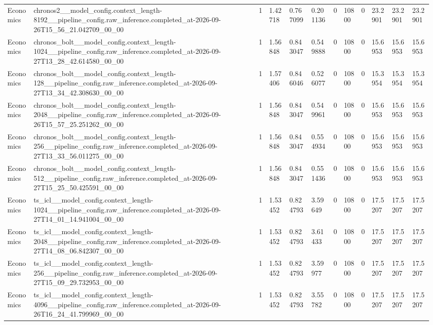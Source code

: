 \begin{tabular}{llllllllllll}
Economics & chronos2\_\_model\_config.context\_length-8192\_\_pipeline\_config.raw\_inference.completed\_at-2026-09-26T15\_56\_21.042709\_00\_00 & 1 & 1.42718 & 0.767099 & 0.201136 & 0 & 10800 & 0 & 23.2901 & 23.2901 & 23.2901 \\
Economics & chronos\_bolt\_\_model\_config.context\_length-1024\_\_pipeline\_config.raw\_inference.completed\_at-2026-09-27T13\_28\_42.614580\_00\_00 & 1 & 1.56848 & 0.843047 & 0.549888 & 0 & 10800 & 0 & 15.6953 & 15.6953 & 15.6953 \\
Economics & chronos\_bolt\_\_model\_config.context\_length-128\_\_pipeline\_config.raw\_inference.completed\_at-2026-09-27T13\_34\_42.308630\_00\_00 & 1 & 1.57406 & 0.846046 & 0.526077 & 0 & 10800 & 0 & 15.3954 & 15.3954 & 15.3954 \\
Economics & chronos\_bolt\_\_model\_config.context\_length-2048\_\_pipeline\_config.raw\_inference.completed\_at-2026-09-26T15\_57\_25.251262\_00\_00 & 1 & 1.56848 & 0.843047 & 0.549961 & 0 & 10800 & 0 & 15.6953 & 15.6953 & 15.6953 \\
Economics & chronos\_bolt\_\_model\_config.context\_length-256\_\_pipeline\_config.raw\_inference.completed\_at-2026-09-27T13\_33\_56.011275\_00\_00 & 1 & 1.56848 & 0.843047 & 0.554934 & 0 & 10800 & 0 & 15.6953 & 15.6953 & 15.6953 \\
Economics & chronos\_bolt\_\_model\_config.context\_length-512\_\_pipeline\_config.raw\_inference.completed\_at-2026-09-27T15\_25\_50.425591\_00\_00 & 1 & 1.56848 & 0.843047 & 0.551436 & 0 & 10800 & 0 & 15.6953 & 15.6953 & 15.6953 \\
Economics & ts\_icl\_\_model\_config.context\_length-1024\_\_pipeline\_config.raw\_inference.completed\_at-2026-09-27T14\_01\_14.941004\_00\_00 & 1 & 1.53452 & 0.824793 & 3.59649 & 0 & 10800 & 0 & 17.5207 & 17.5207 & 17.5207 \\
Economics & ts\_icl\_\_model\_config.context\_length-2048\_\_pipeline\_config.raw\_inference.completed\_at-2026-09-27T14\_08\_06.842307\_00\_00 & 1 & 1.53452 & 0.824793 & 3.61433 & 0 & 10800 & 0 & 17.5207 & 17.5207 & 17.5207 \\
Economics & ts\_icl\_\_model\_config.context\_length-256\_\_pipeline\_config.raw\_inference.completed\_at-2026-09-27T15\_09\_29.732953\_00\_00 & 1 & 1.53452 & 0.824793 & 3.59977 & 0 & 10800 & 0 & 17.5207 & 17.5207 & 17.5207 \\
Economics & ts\_icl\_\_model\_config.context\_length-4096\_\_pipeline\_config.raw\_inference.completed\_at-2026-09-26T16\_24\_41.799969\_00\_00 & 1 & 1.53452 & 0.824793 & 3.55782 & 0 & 10800 & 0 & 17.5207 & 17.5207 & 17.5207 \\

\end{tabular}
